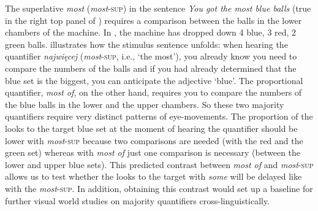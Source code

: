 \documentclass[output=paper]{langscibook}
\begin{document}
The superlative \textit{most} (\textit{most}\textsc{-sup}) in the sentence \textit{You got the most blue balls} (true in the
right top panel of ) requires a comparison between the balls in the lower chambers of the machine. In ,
the machine has dropped down 4 blue, 3 red, 2 green balls.  illustrates how the stimulus sentence unfolds: when
hearing the quantifier \textit{najwięcej} (\textit{most}\textsc{-sup}, i.e., ‘the most’), you already know you need
to compare the numbers of the balls and if you had already determined that the blue set is the biggest, you can
anticipate the adjective ‘blue’. The proportional quantifier, \textit{most of}, on the other hand, requires you to
compare the numbers of the blue balls in the lower and the upper chambers. So these two majority quantifiers require
very distinct patterns of eye-movements. The proportion of the looks to the target blue set at the moment of hearing
the quantifier should be lower with \textit{most}\textsc{-sup} because two comparisons are needed (with the
red and the green set) whereas with \textit{most of} just one comparison is necessary (between the lower and upper blue
sets). This predicted contrast between \textit{most of} and \textit{most}\textsc{-sup} allows us to test
whether the looks to the target with \textit{some} will be delayed like with the \textit{most}\textsc{-sup}.
In addition, obtaining this contrast would set up a baseline for further visual world studies on majority quantifiers
cross-linguistically.









\end{document}
